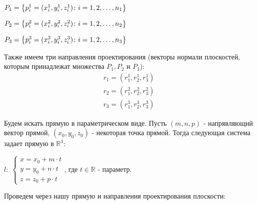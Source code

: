 \begin{center}
	$P_1 = \left\{p_i^1 = (x_i^1, y_i^1, z_i^1)\colon i=1,2,\dots,n_1\right\}$

	\vspace{0.3cm}
	$P_2 = \left\{p_i^2 = (x_i^2, y_i^2, z_i^2)\colon i=1,2,\dots,n_2\right\}$

	\vspace{0.3cm}
	$P_3 = \left\{p_i^3 = (x_i^3, y_i^3, z_i^3)\colon i=1,2,\dots,n_3\right\}$
\end{center}

Также имеем три направления проектирования (векторы нормали плоскостей, которым принадлежат множества $P_1, P_2$ и $P_3$):
$$\begin{gathered}
	r_1 = (r_1^1, r_2^1, r_3^1) \\
	r_2 = (r_1^2, r_2^2, r_3^2) \\
	r_3 = (r_1^3, r_2^3, r_3^3)
\end{gathered}$$

Будем искать прямую в параметрическом виде. Пусть $(m, n, p)$ - напрявляющий вектор прямой, $(x_0, y_0, z_0)$ - некоторая точка прямой. Тогда следующая система задает прямую в $\mathbb{R}^3$: 

\begin{center}
	$\mathit{l}: \; \begin{cases}
		x = x_0 + m \cdot t \\
		y = y_0 + n \cdot t \\
		z = z_0 + p \cdot t
	\end{cases}$, где $t \in \mathbb{R}$ - параметр. 
\end{center}

Проведем через нашу прямую и направления проектирования плоскости:

